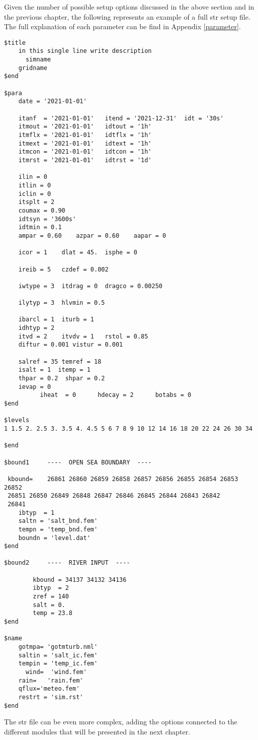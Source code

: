 Given the number of possible setup options discussed in the above section and in the previous chapter, the following represents an
example of a full str setup file.
The full explanation of each parameter can be find in Appendix \ref{parameter}.

%

\begin{verbatim}
$title
	in this single line write description
      simname
	gridname
$end

$para
	date = '2021-01-01'
	
	itanf  = '2021-01-01'	itend = '2021-12-31'  idt = '30s'
	itmout = '2021-01-01'	idtout = '1h' 
	itmflx = '2021-01-01'	idtflx = '1h' 
	itmext = '2021-01-01'	idtext = '1h'
	itmcon = '2021-01-01'	idtcon = '1h'
	itmrst = '2021-01-01'	idtrst = '1d'
	
	ilin = 0
	itlin = 0
	iclin = 0
	itsplt = 2
	coumax = 0.90
	idtsyn = '3600s'
	idtmin = 0.1
	ampar = 0.60	azpar = 0.60	aapar = 0

	icor = 1	dlat = 45.	isphe = 0 

	ireib = 5	czdef = 0.002

	iwtype = 3	itdrag = 0	dragco = 0.00250

	ilytyp = 3	hlvmin = 0.5

	ibarcl = 1	iturb = 1
	idhtyp = 2	
	itvd = 2	itvdv = 1	rstol = 0.85
	diftur = 0.001 vistur = 0.001

	salref = 35	temref = 18
	isalt = 1  itemp = 1 
	thpar = 0.2	 shpar = 0.2
	ievap = 0
          iheat  = 0      hdecay = 2      botabs = 0
$end

$levels
1 1.5 2. 2.5 3. 3.5 4. 4.5 5 6 7 8 9 10 12 14 16 18 20 22 24 26 30 34

$end

$bound1     ----  OPEN SEA BOUNDARY  ----  
   
 kbound=    26861 26860 26859 26858 26857 26856 26855 26854 26853 26852
 26851 26850 26849 26848 26847 26846 26845 26844 26843 26842
 26841 
	ibtyp  = 1
	saltn = 'salt_bnd.fem'
	tempn = 'temp_bnd.fem'
	boundn = 'level.dat'
$end
	
$bound2     ----  RIVER INPUT  ----  

        kbound = 34137 34132 34136
        ibtyp  = 2 
        zref = 140 
        salt = 0.
        temp = 23.8 
$end

$name		
	gotmpa=	'gotmturb.nml'
	saltin = 'salt_ic.fem'
	tempin = 'temp_ic.fem'
      wind=  'wind.fem'
	rain=	'rain.fem'
	qflux='meteo.fem'
	restrt = 'sim.rst'	
$end
\end{verbatim}
The str file can be even more complex, adding the options connected to the different modules that will be presented in the next chapter.